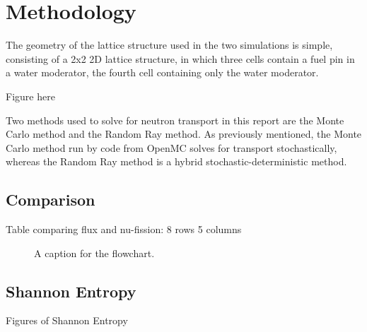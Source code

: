 \pagebreak
\section{Methodology}
\label{sec:methods}
The geometry of the lattice structure used in the two simulations is simple, consisting of a 2x2 2D lattice structure, in which three cells contain a fuel pin in a water moderator, the fourth cell containing only the water moderator.

Figure here

Two methods used to solve for neutron transport in this report are the Monte Carlo method and the Random Ray method. As previously mentioned, the Monte Carlo method run by code from OpenMC solves for transport stochastically, whereas the Random Ray method is a hybrid stochastic-deterministic method.

\pagebreak
\subsection{Comparison}
Table comparing flux and nu-fission: 8 rows 5 columns
\begin{figure}[h]
        \centering
{}
\caption{A caption for the flowchart.}
\label{fig:comp}
\end{figure}

\subsection{Shannon Entropy}
Figures of Shannon Entropy
